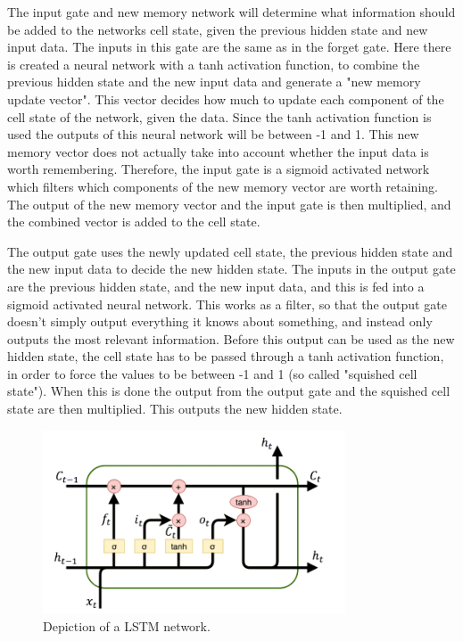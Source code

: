 The input gate and new memory network will determine what information should be added to the networks cell state, given the previous hidden state and new input data. The inputs in this gate are the same as in the forget gate. 
Here there is created a neural network with a tanh activation function, to combine the previous hidden state and the new input data and generate a "new memory update vector". This vector decides how much to update each component of the cell state of the network, given the data. 
Since the tanh activation function is used the outputs of this neural network will be between -1 and 1. 
This new memory vector does not actually take into account whether the input data is worth remembering. 
Therefore, the input gate is a sigmoid activated network which filters which components of the new memory vector are worth retaining. 
The output of the new memory vector and the input gate is then multiplied, and the combined vector is added to the cell state. 

The output gate uses the newly updated cell state, the previous hidden state and the new input data to decide the new hidden state. 
The inputs in the output gate are the previous hidden state, and the new input data, and this is fed into a sigmoid activated neural network. 
This works as a filter, so that the output gate doesn't simply output everything it knows about something, and instead only outputs the most relevant information. 
Before this output can be used as the new hidden state, the cell state has to be passed through a tanh activation function, in order to force the values to be between -1 and 1 (so called "squished cell state"). 
When this is done the output from the output gate and the squished cell state are then multiplied. This outputs the new hidden state.  

\begin{figure}[H]
    \centering
    \includegraphics[width=0.8\textwidth]{data/Figures/Neural networks/lstm.png}
    \caption[Long Short-Term Memory network]{Depiction of a LSTM network.~\cite{dolphin_2021}}\label{fig:LSTM}
\end{figure}

